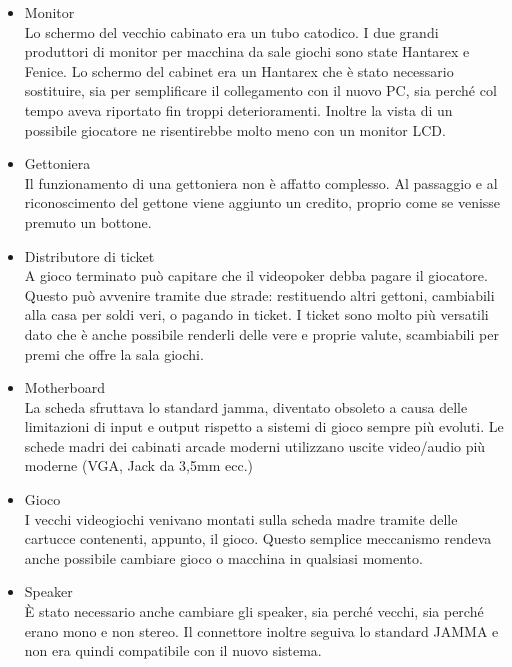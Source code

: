 \begin{itemize}
\item Monitor\\
Lo schermo del vecchio cabinato era un tubo catodico. I due grandi produttori di monitor per macchina da sale giochi sono state Hantarex e Fenice. Lo schermo del cabinet era un Hantarex che è stato necessario sostituire, sia per semplificare il collegamento con il nuovo PC, sia perché col tempo aveva riportato fin troppi deterioramenti. Inoltre la vista di un possibile giocatore ne risentirebbe molto meno con un monitor LCD.
\item Gettoniera \\
Il funzionamento di una gettoniera non è affatto complesso. Al passaggio e al riconoscimento del gettone viene aggiunto un credito, proprio come se venisse premuto un bottone.
\item Distributore di ticket \\
A gioco terminato può capitare che il videopoker debba pagare il giocatore. Questo può avvenire tramite due strade: restituendo altri gettoni, cambiabili alla casa per soldi veri, o pagando in ticket. I ticket sono molto più versatili dato che è anche possibile renderli delle vere e proprie valute, scambiabili per premi che offre la sala giochi.
\item Motherboard \\
La scheda sfruttava lo standard \gls{jamma}, diventato obsoleto a causa delle limitazioni di input e output rispetto a sistemi di gioco sempre più evoluti. Le schede madri dei cabinati arcade moderni utilizzano uscite video/audio più moderne (VGA, Jack da 3,5mm ecc.)
\item Gioco \\
I vecchi videogiochi venivano montati sulla scheda madre tramite delle cartucce contenenti, appunto, il gioco. Questo semplice meccanismo rendeva anche possibile cambiare gioco o macchina in qualsiasi momento.
\item Speaker \\
È stato necessario anche cambiare gli speaker, sia perché vecchi, sia perché erano mono e non stereo. Il connettore inoltre seguiva lo standard JAMMA e non era quindi compatibile con il nuovo sistema.
\end{itemize}
